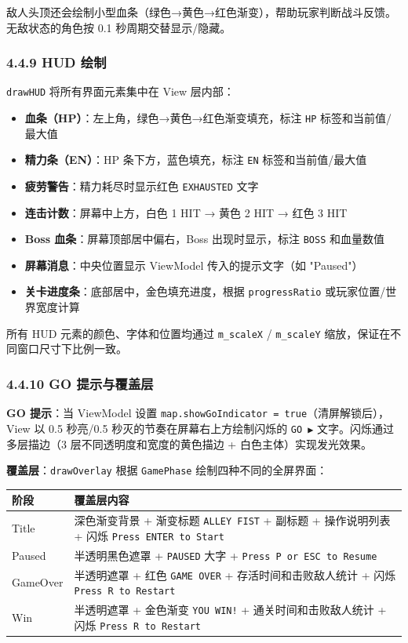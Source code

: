 \documentclass[12pt,fontset=none]{ctexart}
\begin{document}
敌人头顶还会绘制小型血条（绿色→黄色→红色渐变），帮助玩家判断战斗反馈。无敌状态的角色按 0.1 秒周期交替显示/隐藏。

\subsubsection{4.4.9 HUD 绘制}

\texttt{drawHUD} 将所有界面元素集中在 View 层内部：

\begin{itemize}
\item \textbf{血条（HP）}：左上角，绿色→黄色→红色渐变填充，标注 \texttt{HP} 标签和当前值/最大值
\item \textbf{精力条（EN）}：HP 条下方，蓝色填充，标注 \texttt{EN} 标签和当前值/最大值
\item \textbf{疲劳警告}：精力耗尽时显示红色 \texttt{EXHAUSTED} 文字
\item \textbf{连击计数}：屏幕中上方，白色 1 HIT → 黄色 2 HIT → 红色 3 HIT
\item \textbf{Boss 血条}：屏幕顶部居中偏右，Boss 出现时显示，标注 \texttt{BOSS} 和血量数值
\item \textbf{屏幕消息}：中央位置显示 ViewModel 传入的提示文字（如 "Paused"）
\item \textbf{关卡进度条}：底部居中，金色填充进度，根据 \texttt{progressRatio} 或玩家位置/世界宽度计算
\end{itemize}

所有 HUD 元素的颜色、字体和位置均通过 \texttt{m\_scaleX} / \texttt{m\_scaleY} 缩放，保证在不同窗口尺寸下比例一致。

\subsubsection{4.4.10 GO 提示与覆盖层}

\textbf{GO 提示}：当 ViewModel 设置 \texttt{map.showGoIndicator = true}（清屏解锁后），View 以 0.5 秒亮/0.5 秒灭的节奏在屏幕右上方绘制闪烁的 \texttt{GO ▶} 文字。闪烁通过多层描边（3 层不同透明度和宽度的黄色描边 + 白色主体）实现发光效果。

\textbf{覆盖层}：\texttt{drawOverlay} 根据 \texttt{GamePhase} 绘制四种不同的全屏界面：

\begin{longtable}{l l}
\toprule
\textbf{阶段} & \textbf{覆盖层内容} \\
\midrule
\endhead
Title & 深色渐变背景 + 渐变标题 \texttt{ALLEY FIST} + 副标题 + 操作说明列表 + 闪烁 \texttt{Press ENTER to Start} \\
Paused & 半透明黑色遮罩 + \texttt{PAUSED} 大字 + \texttt{Press P or ESC to Resume} \\
GameOver & 半透明遮罩 + 红色 \texttt{GAME OVER} + 存活时间和击败敌人统计 + 闪烁 \texttt{Press R to Restart} \\
Win & 半透明遮罩 + 金色渐变 \texttt{YOU WIN!} + 通关时间和击败敌人统计 + 闪烁 \texttt{Press R to Restart} \\
\bottomrule
\end{longtable}
\end{document}
